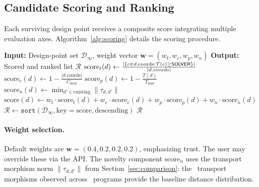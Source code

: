 \documentclass[11pt]{article}
\begin{document}
\subsection{Candidate Scoring and Ranking}

Each surviving design point receives a composite score integrating
multiple evaluation axes.  Algorithm~\ref{alg:scoring} details the
scoring procedure.

\begin{algorithm}[H]
\caption{Candidate Scoring and Ranking}
\label{alg:scoring}
\begin{algorithmic}[1]
\STATE \textbf{Input:} Design-point set $\mathcal{D}_\infty$,
       weight vector $\mathbf{w} = (w_t, w_c, w_p, w_n)$
\STATE \textbf{Output:} Scored and ranked list $\mathcal{R}$
\STATE
{}
  \STATE {}
  \STATE $\text{score}_t(d) \gets
         \frac{|\{c \in d.\text{coords} : \mathcal{T}(c) \geq \mathsf{SOLVER}\}|}
              {|d.\text{coords}|}$
  \STATE
  \STATE {}
  \STATE $\text{score}_c(d) \gets 1 -
         \frac{|d.\text{coords}|}{C_{\max}}$
  \STATE
  \STATE {}
  \STATE $\text{score}_p(d) \gets 1 -
         \frac{T(d)}{T_{\max}}$
  \STATE
  \STATE {}
  \STATE $\text{score}_n(d) \gets
         \min_{d' \in \text{existing}} \|\tau_{d,d'}\|$
  \STATE
  \STATE {}
  \STATE $\text{score}(d) \gets w_t \cdot \text{score}_t(d) +
         w_c \cdot \text{score}_c(d) + w_p \cdot \text{score}_p(d) +
         w_n \cdot \text{score}_n(d)$
\ENDFOR
\STATE $\mathcal{R} \gets \texttt{sort}(\mathcal{D}_\infty,
       \text{key}=\text{score}, \text{descending})$
\RETURN $\mathcal{R}$
\end{algorithmic}
\end{algorithm}

\paragraph{Weight selection.}
Default weights are $\mathbf{w} = (0.4, 0.2, 0.2, 0.2)$, emphasizing
trust.  The user may override these via the API.  The novelty component
$\text{score}_n$ uses the transport morphism norm $\|\tau_{d,d'}\|$
from Section~\ref{sec:comparison}: the \compMorphTransport\ transport
morphisms observed across \compTotalPrograms\ programs provide the
baseline distance distribution.
\end{document}
